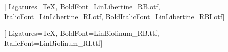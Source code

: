 %
%
%





\setlength{\textwidth}{146.8mm} %
\setlength{\oddsidemargin}{11.6mm} %
\setlength{\evensidemargin}{0.8mm} %
\setlength{\topmargin}{-2.2mm} %
\setlength{\textheight}{221.9mm} %
\setlength{\headheight}{14pt}


\usepackage[libertine]{newtxmath}

\usepackage{fontspec}
\setmainfont{LinLibertine_R.otf}[%
  Ligatures=TeX,%
  BoldFont=LinLibertine_RB.otf,%
  ItalicFont=LinLibertine_RI.otf,%
  BoldItalicFont=LinLibertine_RBI.otf]

\setsansfont{LinBiolinum_R.ttf}[%
    Ligatures=TeX,%
    BoldFont=LinBiolinum_RB.ttf,%
    ItalicFont=LinBiolinum_RI.ttf]

\usepackage{polyglossia}
\setmainlanguage{english}



\setlength{\parindent}{0pt}

\usepackage{setspace} %

